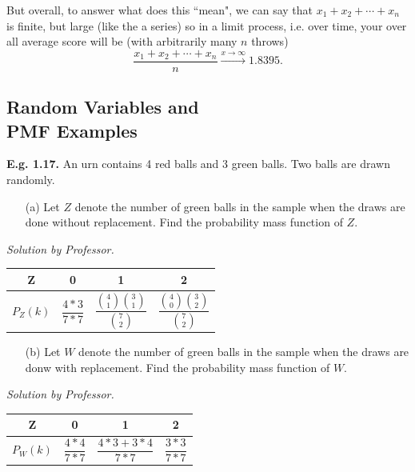 \documentclass[12pt]{book}
\begin{document}
But overall, to answer what does this ``mean", we can say that 
$x_{1}+x_{2}+\cdots+x_{n}$ is finite, but large (like the a series)
so in a limit process, i.e. over time, your over all average score will be (with arbitrarily many $n$ throws)
$$\frac{x_{1}+x_{2}+\cdots+x_{n}}{n} \xrightarrow{x\to \infty} 1.8395.$$











\subsection{Random Variables and \\PMF Examples}
\noindent \textbf{E.g. 1.17. } An urn contains 4 red balls and 3 green balls. Two balls are drawn randomly. 
\begin{itemize} \item [(a)] Let $Z$ denote the number of green balls in the sample when the draws are done without replacement. Find the probability mass function of $Z$.\end{itemize}
\textit{Solution by Professor. }\\
\begin{center}
\begin{tabular}{|c|c|c|c|}
\hline
	Z & 0 & 1 & 2\\
\hline
	$P_{Z}(k)$ & $\dfrac{4*3}{7*7}$ & $\dfrac{{4\choose1}{3\choose1}}{{7\choose2}}$ & $\dfrac{{4\choose0}{3\choose2}}{{7\choose2}}$ \\
\hline
\end{tabular}
\end{center}

\begin{itemize} \item [(b)] Let $W$ denote the number of green balls in the sample when the draws are donw with replacement. Find the probability mass function of $W$. \end{itemize}
\textit{Solution by Professor. }\\
\begin{center}
\begin{tabular}{|c|c|c|c|}
\hline
	Z & 0 & 1 & 2\\
\hline
	$P_{W}(k)$ & $\dfrac{4*4}{7*7}$ & $\dfrac{4*3+3*4}{7*7}$ & $\dfrac{3*3}{7*7}$ \\
\hline
\end{tabular}
\end{center}
\end{document}
